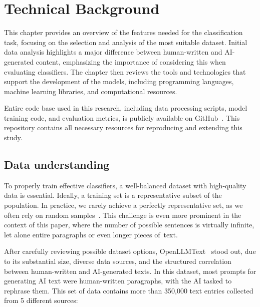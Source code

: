 

\chapter{Technical Background}
\label{04_Technical_Background}
\thispagestyle{empty}

This chapter provides an overview of the features needed for the classification task, focusing on the selection and analysis of the most suitable dataset. Initial data analysis highlights a major difference between human-written and AI-generated content, emphasizing the importance of considering this when evaluating classifiers. The chapter then reviews the tools and technologies that support the development of the models, including programming languages, machine learning libraries, and computational resources.

\vspace{3mm}
Entire code base used in this research, including data processing scripts, model training code, and evaluation metrics, is publicly available on GitHub~\cite{neuman2025aicontentdetectors}. This repository contains all necessary resources for reproducing and extending this study.

\section{Data understanding}

To properly train effective classifiers, a well-balanced dataset with high-quality data is essential. Ideally, a training set is a representative subset of the population. In practice, we rarely achieve a perfectly representative set, as we often rely on random samples~\cite{borovicka2012selecting}. This challenge is even more prominent in the context of this paper, where the number of possible sentences is virtually infinite, let alone entire paragraphs or even longer pieces of~text. 

\vspace{3mm}

After carefully reviewing possible dataset options, OpenLLMText~\cite{chen2023openllmtext} stood out, due to its substantial size, diverse data sources, and the structured correlation between human-written and AI-generated texts. In this dataset, most prompts for generating AI text were human-written paragraphs, with the AI tasked to rephrase them. This set of data contains more than 350,000 text entries collected from 5 different sources:

